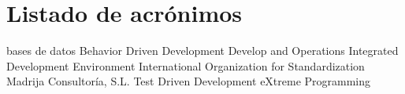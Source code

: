 \chapter{Listado de acrónimos}

\begin{acronym}[Madrija]

      {bases de datos}
  	 {Behavior Driven Development}
    {Develop and Operations}
  	 {Integrated Development Environment}
  	 {International Organization for Standardization}
   {Madrija Consultoría, S.L.}
       {Test Driven Development}
        {eXtreme Programming}
  
\end{acronym}
